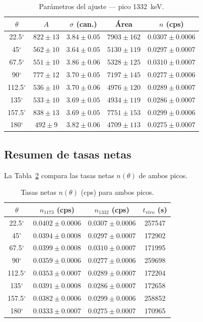 \documentclass[11pt,a4paper]{article}
\begin{document}
\begin{table}[ht]
  \centering
  \caption{Par\'ametros del ajuste — pico 1332~keV.}
  \label{tab:parametros_1332}
  \small
  \begin{tabular}{c|c|c|c|c}
    \hline
    $\theta$ & $A$ & $\sigma$ (can.) & \'{A}rea & $n$ (cps) \\
    \hline
    22.5$^\circ$  & $822 \pm 13$ & $3.84 \pm 0.05$ & $7903 \pm 162$ & $0.0307 \pm 0.0006$ \\
    45$^\circ$    & $562 \pm 10$ & $3.64 \pm 0.05$ & $5130 \pm 119$ & $0.0297 \pm 0.0007$ \\
    67.5$^\circ$  & $551 \pm 10$ & $3.86 \pm 0.06$ & $5328 \pm 125$ & $0.0310 \pm 0.0007$ \\
    90$^\circ$    & $777 \pm 12$ & $3.70 \pm 0.05$ & $7197 \pm 145$ & $0.0277 \pm 0.0006$ \\
    112.5$^\circ$ & $536 \pm 10$ & $3.70 \pm 0.06$ & $4976 \pm 120$ & $0.0289 \pm 0.0007$ \\
    135$^\circ$   & $533 \pm 10$ & $3.69 \pm 0.05$ & $4934 \pm 119$ & $0.0286 \pm 0.0007$ \\
    157.5$^\circ$ & $838 \pm 13$ & $3.69 \pm 0.05$ & $7751 \pm 153$ & $0.0299 \pm 0.0006$ \\
    180$^\circ$   & $492 \pm 9$  & $3.82 \pm 0.06$ & $4709 \pm 113$ & $0.0275 \pm 0.0007$ \\
    \hline
  \end{tabular}
\end{table}

\newpage
\subsection{Resumen de tasas netas}

La Tabla~\ref{tab:tasas} compara las tasas netas $n(\theta)$ de ambos picos.

\begin{table}[ht]
  \centering
  \caption{Tasas netas $n(\theta)$ (cps) para ambos picos.}
  \label{tab:tasas}
  \small
  \begin{tabular}{c|c|c|c}
    \hline
    $\theta$ & $n_{1173}$ (cps) & $n_{1332}$ (cps) & $t_{\text{vivo}}$ (s) \\
    \hline
    22.5$^\circ$  & $0.0402 \pm 0.0006$ & $0.0307 \pm 0.0006$ & 257547 \\
    45$^\circ$    & $0.0394 \pm 0.0008$ & $0.0297 \pm 0.0007$ & 172902 \\
    67.5$^\circ$  & $0.0399 \pm 0.0008$ & $0.0310 \pm 0.0007$ & 171995 \\
    90$^\circ$    & $0.0359 \pm 0.0006$ & $0.0277 \pm 0.0006$ & 259698 \\
    112.5$^\circ$ & $0.0353 \pm 0.0007$ & $0.0289 \pm 0.0007$ & 172204 \\
    135$^\circ$   & $0.0391 \pm 0.0008$ & $0.0286 \pm 0.0007$ & 172658 \\
    157.5$^\circ$ & $0.0382 \pm 0.0006$ & $0.0299 \pm 0.0006$ & 258852 \\
    180$^\circ$   & $0.0333 \pm 0.0007$ & $0.0275 \pm 0.0007$ & 170965 \\
    \hline
  \end{tabular}
\end{table}
\end{document}
